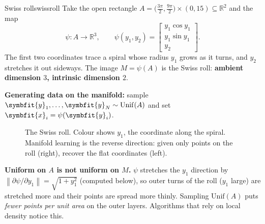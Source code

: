 \documentclass[11pt]{article}
\newcommand{\bm}[1]{\symbfit{#1}}
\newcommand{\R}{\mathbb{R}}
\newcommand{\vx}{\bm{x}}
\newcommand{\norm}[1]{\left\lVert #1\right\rVert}
\begin{document}
\begin{example}{Swiss roll}{swissroll}
Take the open rectangle $A=\big(\tfrac{3\pi}2,\tfrac{9\pi}2\big)\times(0,15)\subseteq\R^2$ and the map
\[
\psi:A\to\R^3,\qquad \psi(y_1,y_2)=\begin{bmatrix}y_1\cos y_1\\ y_1\sin y_1\\ y_2\end{bmatrix}.
\]
The first two coordinates trace a spiral whose radius $y_1$ grows as it turns, and $y_2$ stretches it out sideways. The
image $M=\psi(A)$ is the Swiss roll: \textbf{ambient dimension $3$, intrinsic dimension $2$}.

\textbf{Generating data on the manifold:} sample $\bm y_1,\dots,\bm y_N\sim\mathrm{Unif}(A)$ and set $\vx_i=\psi(\bm y_i)$.
\end{example}

\begin{figure}[htbp]
\centering
{}
\caption{The Swiss roll. Colour shows $y_1$, the coordinate along the spiral. Manifold learning is the reverse
direction: given only points on the roll (right), recover the flat coordinates (left).}
\end{figure}

\begin{careful}
\textbf{Uniform on $A$ is not uniform on $M$.} $\psi$ stretches the $y_1$ direction by $\norm{\partial\psi/\partial y_1}=\sqrt{1+y_1^2}$ (computed
below), so outer turns of the roll ($y_1$ large) are stretched more and their points are spread more thinly. Sampling
$\mathrm{Unif}(A)$ puts \emph{fewer points per unit area} on the outer layers. Algorithms that rely on local density
notice this.
\end{careful}
\end{document}
